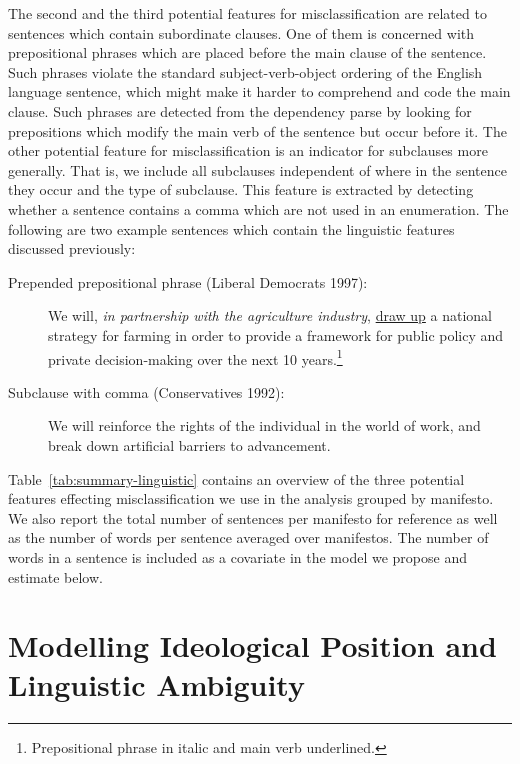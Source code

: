 \documentclass[a4paper, 12pt]{article}
\begin{document}
The second and the third potential features for misclassification are related to sentences which contain subordinate clauses. One of them is concerned with prepositional phrases which are placed before the main clause of the sentence. Such phrases violate the standard subject-verb-object ordering of the English language sentence, which might make it harder to comprehend and code the main clause. Such phrases are detected from the dependency parse by looking for prepositions which modify the main verb of the sentence but occur before it. The other potential feature for misclassification is an indicator for subclauses more generally. That is, we include all subclauses independent of where in the sentence they occur and the type of subclause. This feature is extracted by detecting whether a sentence contains a comma which are not used in an enumeration.
%
The following are two example sentences which contain the linguistic features discussed previously:
\begin{description}
  \item[Prepended prepositional phrase \textnormal{(Liberal Democrats 1997)}:] We will, \emph{in partnership with the agriculture industry}, \underline{draw up} a national strategy for farming in order to provide a framework for public policy and private decision-making over the next 10 years.\footnote{Prepositional phrase in italic and main verb underlined.}
  \item[Subclause with comma \textnormal{(Conservatives 1992)}:] We will reinforce the rights of the individual in the world of work, and break down artificial barriers to advancement.
\end{description}

Table~\ref{tab:summary-linguistic} contains an overview of the three potential features effecting misclassification we use in the analysis grouped by manifesto. We also report the total number of sentences per manifesto for reference as well as the number of words per sentence averaged over manifestos. The number of words in a sentence is included as a covariate in the model we propose and estimate below.


\section{Modelling Ideological Position and Linguistic Ambiguity}
\end{document}
